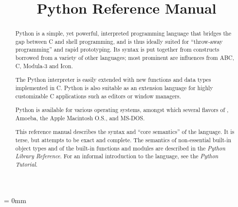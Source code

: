 
\title{Python Reference Manual}



\makeindex




\maketitle



\begin{abstract}

\noindent
Python is a simple, yet powerful, interpreted programming language
that bridges the gap between C and shell programming, and is thus
ideally suited for ``throw-away programming'' and rapid prototyping.
Its syntax is put together from constructs borrowed from a variety of
other languages; most prominent are influences from ABC, C, Modula-3
and Icon.

The Python interpreter is easily extended with new functions and data
types implemented in C.  Python is also suitable as an extension
language for highly customizable C applications such as editors or
window managers.

Python is available for various operating systems, amongst which
several flavors of {\UNIX}, Amoeba, the Apple Macintosh O.S.,
and MS-DOS.

This reference manual describes the syntax and ``core semantics'' of
the language.  It is terse, but attempts to be exact and complete.
The semantics of non-essential built-in object types and of the
built-in functions and modules are described in the {\em Python
Library Reference}.  For an informal introduction to the language, see
the {\em Python Tutorial}.

\end{abstract}

\pagebreak

{
\parskip = 0mm
\tableofcontents
}

\pagebreak






